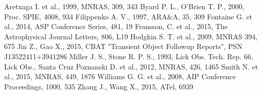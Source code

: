 \documentclass[iop]{emulateapj}
\begin{document}
\begin{thebibliography}{}
 Aretxaga I. et al., 1999, MNRAS, 309, 343
 Byard P. L., O'Brien T. P., 2000, Proc. SPIE, 4008, 934
 Filippenko A. V., 1997, ARA\&A, 35, 309
 Fontaine G. et al., 2014, ASP Conference Series, 481, 19
 Fransson, C. et al., 2015, The Astrophysical Journal Letters, 806, L19
 Hodgkin S. T. et al., 2009, MNRAS 394, 675
 Jin Z., Gao X., 2015, CBAT "Transient Object Followup Reports", PSN J13522411+3941286
 Miller J. S., Stone R. P. S., 1993, Lick Obs. Tech. Rep. 66, Lick Obs., Santa Cruz
 Poznanski D. et al., 2012, MNRAS, 426, 1465
 Smith N. et al., 2015, MNRAS, 449, 1876
 Williams G. G. et al., 2008, AIP Conference Proceedings, 1000, 535
 Zhang J., Wang X., 2015, ATel, 6939
\end{thebibliography}
\end{document}

